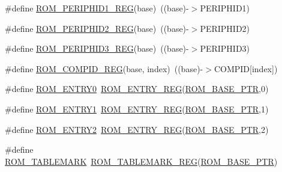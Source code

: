 \begin{DoxyCompactItemize}
\item 
\#define \hyperlink{group___r_o_m___register___accessor___macros_ga293b3b6eaf2b3b39d7343b14e1845b4f}{R\+O\+M\+\_\+\+P\+E\+R\+I\+P\+H\+I\+D1\+\_\+\+R\+EG}(base)~((base)-\/$>$P\+E\+R\+I\+P\+H\+I\+D1)
\item 
\#define \hyperlink{group___r_o_m___register___accessor___macros_gac1ebfc31a7ae53d67acd0a8fcc4594e9}{R\+O\+M\+\_\+\+P\+E\+R\+I\+P\+H\+I\+D2\+\_\+\+R\+EG}(base)~((base)-\/$>$P\+E\+R\+I\+P\+H\+I\+D2)
\item 
\#define \hyperlink{group___r_o_m___register___accessor___macros_ga83d8e6b599e7f968e226687ad93282cc}{R\+O\+M\+\_\+\+P\+E\+R\+I\+P\+H\+I\+D3\+\_\+\+R\+EG}(base)~((base)-\/$>$P\+E\+R\+I\+P\+H\+I\+D3)
\item 
\#define \hyperlink{group___r_o_m___register___accessor___macros_gadf3bba37f4d1e368614a96a068c8c6c1}{R\+O\+M\+\_\+\+C\+O\+M\+P\+I\+D\+\_\+\+R\+EG}(base,  index)~((base)-\/$>$C\+O\+M\+P\+ID\mbox{[}index\mbox{]})
\item 
\#define \hyperlink{group___r_o_m___register___accessor___macros_gada69a41d0a902f6012e684efb7c9e3ad}{R\+O\+M\+\_\+\+E\+N\+T\+R\+Y0}~\hyperlink{group___r_o_m___register___accessor___macros_gab4e97748d1b7d5e8024f502e628709fa}{R\+O\+M\+\_\+\+E\+N\+T\+R\+Y\+\_\+\+R\+EG}(\hyperlink{group___r_o_m___peripheral_ga5ad426d10b6832ca7012e8767113f686}{R\+O\+M\+\_\+\+B\+A\+S\+E\+\_\+\+P\+TR},0)
\item 
\#define \hyperlink{group___r_o_m___register___accessor___macros_gac1064716d92d1384ff4b0bf063baabe6}{R\+O\+M\+\_\+\+E\+N\+T\+R\+Y1}~\hyperlink{group___r_o_m___register___accessor___macros_gab4e97748d1b7d5e8024f502e628709fa}{R\+O\+M\+\_\+\+E\+N\+T\+R\+Y\+\_\+\+R\+EG}(\hyperlink{group___r_o_m___peripheral_ga5ad426d10b6832ca7012e8767113f686}{R\+O\+M\+\_\+\+B\+A\+S\+E\+\_\+\+P\+TR},1)
\item 
\#define \hyperlink{group___r_o_m___register___accessor___macros_ga0ae5079cc5e456ff696440862af66421}{R\+O\+M\+\_\+\+E\+N\+T\+R\+Y2}~\hyperlink{group___r_o_m___register___accessor___macros_gab4e97748d1b7d5e8024f502e628709fa}{R\+O\+M\+\_\+\+E\+N\+T\+R\+Y\+\_\+\+R\+EG}(\hyperlink{group___r_o_m___peripheral_ga5ad426d10b6832ca7012e8767113f686}{R\+O\+M\+\_\+\+B\+A\+S\+E\+\_\+\+P\+TR},2)
\item 
\#define \hyperlink{group___r_o_m___register___accessor___macros_gaf0a5aeb4d78f9d16a13d1e5372484075}{R\+O\+M\+\_\+\+T\+A\+B\+L\+E\+M\+A\+RK}~\hyperlink{group___r_o_m___register___accessor___macros_gaf92010f49e8870d94588098c5f7b42d7}{R\+O\+M\+\_\+\+T\+A\+B\+L\+E\+M\+A\+R\+K\+\_\+\+R\+EG}(\hyperlink{group___r_o_m___peripheral_ga5ad426d10b6832ca7012e8767113f686}{R\+O\+M\+\_\+\+B\+A\+S\+E\+\_\+\+P\+TR})

\end{DoxyCompactItemize}
